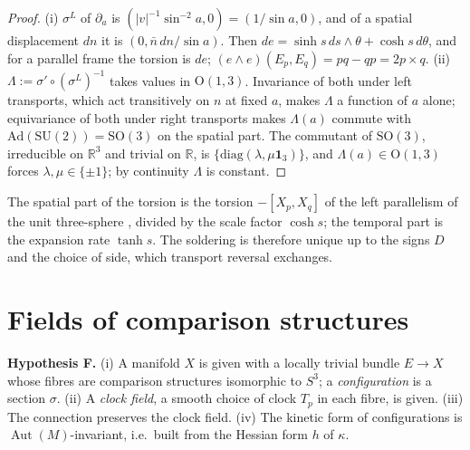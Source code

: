 \documentclass[aps,pra,onecolumn,superscriptaddress,nofootinbib,10pt]{revtex4-2}
\theoremstyle{definition}
\theoremstyle{remark}
\newcommand{\R}{\mathbb{R}}
\newcommand{\Aut}{\operatorname{Aut}}
\newcommand{\SU}{\mathrm{SU}}
\newcommand{\SO}{\mathrm{SO}}
\newcommand{\OO}{\mathrm{O}}
\begin{document}
\begin{proof}
(i) $\sigma^L$ of $\partial_a$ is $(\lvert v\rvert^{-1}\sin^{-2}a,0)=(1/\sin a,0)$, and of a spatial displacement
$dn$ it is $(0,\bar n\,dn/\sin a)$.  Then $de=\sinh s\,ds\wedge\theta+\cosh s\,d\theta$, and for a parallel frame
the torsion is $de$; $(e\wedge e)(E_p,E_q)=pq-qp=2p\times q$.
(ii) $\Lambda:=\sigma'\circ(\sigma^L)^{-1}$ takes values in $\OO(1,3)$.  Invariance of both under left
transports, which act transitively on $n$ at fixed $a$, makes $\Lambda$ a function of $a$ alone; equivariance
of both under right transports makes $\Lambda(a)$ commute with $\mathrm{Ad}(\SU(2))=\SO(3)$ on the spatial part.
The commutant of $\SO(3)$, irreducible on $\R^3$ and trivial on $\R$, is $\{\mathrm{diag}(\lambda,\mu\mathbf1_3)\}$,
and $\Lambda(a)\in\OO(1,3)$ forces $\lambda,\mu\in\{\pm1\}$; by continuity $\Lambda$ is constant.
\end{proof}
The spatial part of the torsion is the torsion $-[X_p,X_q]$ of the left parallelism of the unit
three-sphere \cite[Prop.~5.3(i)]{PaperI}, divided by the scale factor $\cosh s$; the temporal part is the expansion rate
$\tanh s$.  The soldering is therefore unique up to the signs $D$ and the choice of side, which
transport reversal exchanges.

\section{Fields of comparison structures}\label{sec:fields}

\smallskip\noindent\textbf{Hypothesis F.}  (i) A manifold $X$ is given with a locally trivial bundle
$E\to X$ whose fibres are comparison structures isomorphic to $S^3$; a \emph{configuration} is a section
$\sigma$.  (ii) A \emph{clock field}, a smooth choice of clock $T_p$ in each fibre, is given.  (iii) The
connection preserves the clock field.  (iv) The kinetic form of configurations is
$\Aut(M)$-invariant, i.e.\ built from the Hessian form $h$ of $\kappa$.
\end{document}
